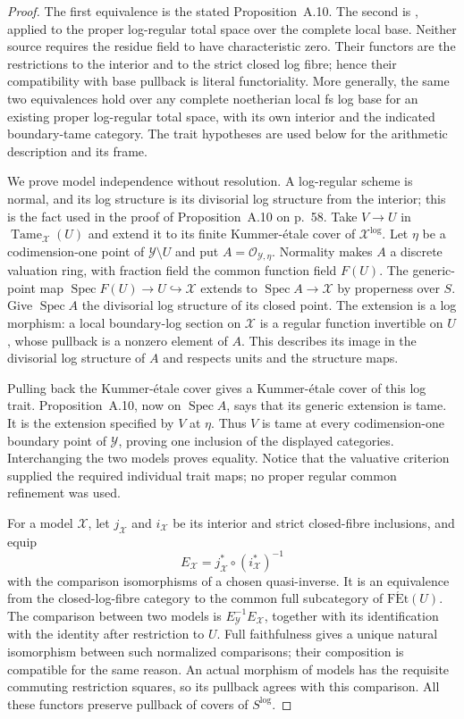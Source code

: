\begin{proof}
The first equivalence is the stated Proposition~A.10. The second is
\cite[Corollary~3.9, pp.~31--32]{HoshiLog2009A567}, applied to the proper
log-regular total space over the complete local base. Neither source
requires the residue field to have characteristic zero. Their functors
are the restrictions to the interior and to the strict closed log
fibre; hence their compatibility with base pullback is literal
functoriality. More generally, the same two equivalences hold over any
complete noetherian local fs log base for an existing proper log-regular
total space, with its own interior and the indicated boundary-tame
category. The trait hypotheses are used below for the arithmetic
description and its frame.

We prove model independence without resolution. A log-regular scheme
is normal, and its log structure is its divisorial log structure from
the interior; this is the fact used in the proof of Proposition~A.10
on p.~58. Take $V\to U$ in
$\operatorname{Tame}_{\mathcal X}(U)$ and extend it to its finite
Kummer-\'etale cover of $\mathcal X^{\log}$. Let $\eta$ be a
codimension-one point of $\mathcal Y\setminus U$ and put
$A=\mathcal O_{\mathcal Y,\eta}$. Normality makes $A$ a discrete
valuation ring, with fraction field the common function field $F(U)$.
The generic-point map
$\operatorname{Spec}F(U)\to U\hookrightarrow\mathcal X$ extends to
$\operatorname{Spec}A\to\mathcal X$ by properness over $S$.
Give $\operatorname{Spec}A$ the divisorial log structure of its closed
point. The extension is a log morphism: a local boundary-log section
on $\mathcal X$ is a regular function invertible on $U$, whose pullback
is a nonzero element of $A$. This describes its image in the
divisorial log structure of $A$ and respects units and the structure
maps.

Pulling back the Kummer-\'etale cover gives a Kummer-\'etale cover of
this log trait. Proposition~A.10, now on $\operatorname{Spec}A$, says
that its generic extension is tame. It is the extension specified by
$V$ at $\eta$. Thus $V$ is tame at every codimension-one boundary point
of $\mathcal Y$, proving one inclusion of the displayed categories.
Interchanging the two models proves equality. Notice that the
valuative criterion supplied the required individual trait maps;
no proper regular common refinement was used.

For a model $\mathcal X$, let $j_{\mathcal X}$ and $i_{\mathcal X}$
be its interior and strict closed-fibre inclusions, and equip
\[
 E_{\mathcal X}=j_{\mathcal X}^*\circ(i_{\mathcal X}^*)^{-1}
\]
with the comparison isomorphisms of a chosen quasi-inverse. It is an
equivalence from the closed-log-fibre category to the common full
subcategory of $\operatorname{F\acute Et}(U)$. The comparison between
two models is $E_{\mathcal Y}^{-1}E_{\mathcal X}$, together with its
identification with the identity after restriction to $U$.
Full faithfulness gives a unique natural isomorphism between such
normalized comparisons; their composition is compatible for the same
reason. An actual morphism of models has the requisite commuting
restriction squares, so its pullback agrees with this comparison.
All these functors preserve pullback of covers of $S^{\log}$.


\end{proof}
